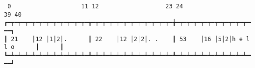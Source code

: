 \documentclass[varwidth=20cm,crop]{standalone}
\begin{document}
\begin{verbatim}
 0                    11 12                   23 24                           39 40
┏━┯━┯━┯━┯━┯━┯━┯━┯━┯━┯━┯━╈━┯━┯━┯━┯━┯━┯━┯━┯━┯━┯━┯━╈━┯━┯━┯━┯━┯━┯━┯━┯━┯━┯━┯━┯━┯━┯━┯━╈━━//━━┓
┃ 21    │12 │1│2│.      ┃ 22    │12 │2│2│. .    ┃ 53    │16 │5│2│h e l l o      ┃      ┃
┗━┷━┷━┷━┷━┷━┷━┷━┷━┷━┷━┷━┻━┷━┷━┷━┷━┷━┷━┷━┷━┷━┷━┷━┻━┷━┷━┷━┷━┷━┷━┷━┷━┷━┷━┷━┷━┷━┷━┷━┻━━//━━┛
\end{verbatim}
\end{document}

